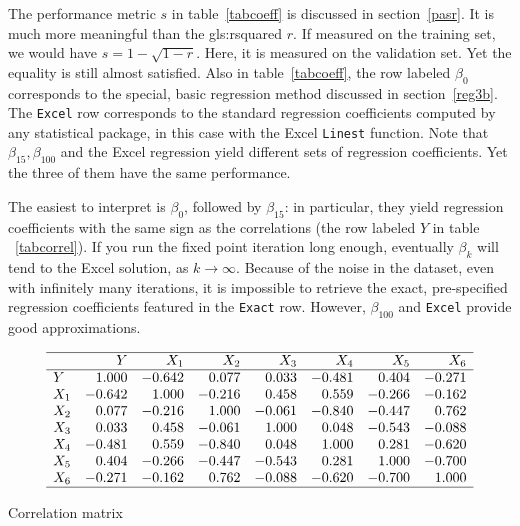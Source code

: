 \documentclass[oneside,10pt]{book}
\begin{document}
The performance metric $s$ in table~\ref{tabcoeff} is discussed in section~\ref{pasr}. It is much more meaningful than the \gls{gls:rsquared} $r$. If measured on the training set, we would have $s=1-\sqrt{1-r}$. Here, it is measured on the validation set. Yet the equality is still almost satisfied. Also in table~\ref{tabcoeff}, the row labeled $\beta_0$ corresponds to the special, basic regression method discussed in section~\ref{reg3b}. The \texttt{Excel} row corresponds to the standard regression coefficients computed by any statistical package, in this case with the Excel \texttt{Linest} function. Note that $\beta_{15},\beta_{100}$ and the Excel regression yield different sets of regression coefficients. Yet the three of them have the same performance.

The easiest to interpret is $\beta_0$, followed by $\beta_{15}$: in particular, they yield regression coefficients with the same sign as the correlations (the row labeled $Y$ in table ~\ref{tabcorrel}). If you run the fixed point iteration long enough, eventually $\beta_k$ will tend to the Excel solution, as $k\rightarrow\infty$. Because of the noise in the dataset, even with infinitely many iterations, it is impossible to retrieve the exact, pre-specified regression coefficients featured in the \texttt{Exact} row.
However, $\beta_{100}$ and \texttt{Excel} provide good approximations.


\begin{table}%
\small
\[
\begin{array}{lrrrrrrr}
\hline
  &  Y & X_1 & X_2  & X_3 & X_4 & X_5 & X_6\\
\hline
Y	&	1.000	&	-0.642	&	0.077	&	0.033	&	-0.481	&	0.404	&	-0.271	\\
X_1	&	-0.642	&	1.000	&	-0.216	&	0.458	&	0.559	&	-0.266	&	-0.162	\\
X_2	&	0.077	&	-0.216	&	1.000	&	-0.061	&	-0.840	&	-0.447	&	0.762	\\
X_3	&	0.033	&	0.458	&	-0.061	&	1.000	&	0.048	&	-0.543	&	-0.088	\\
X_4	&	-0.481	&	0.559	&	-0.840	&	0.048	&	1.000	&	0.281	&	-0.620	\\
X_5	&	0.404	&	-0.266	&	-0.447	&	-0.543	&	0.281	&	1.000	&	-0.700	\\
X_6	&	-0.271	&	-0.162	&	0.762	&	-0.088	&	-0.620	&	-0.700	&	1.000	\\
\hline
\end{array}
\]
\caption{\label{tabcorrel}Correlation matrix}
\end{table}
\end{document}
